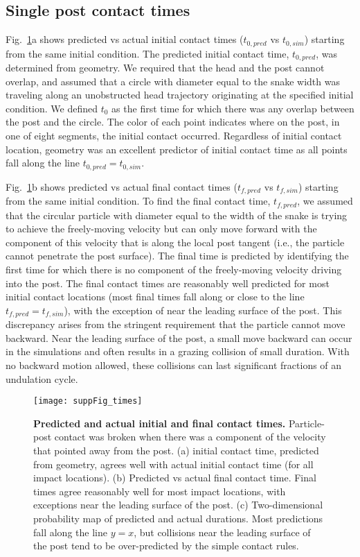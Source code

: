 \documentclass[aps,pre,twocolumn,superscriptaddress]{revtex4-1}
\begin{document}
\subsection{Single post contact times}
\label{suppmat:duration}
Fig.~\ref{fig:SuppTimes}a shows predicted vs actual initial contact times ($t_{0,pred}$ vs $t_{0,sim}$) starting from the same initial condition. The predicted initial contact time, $t_{0,pred}$, was determined from geometry.  We required that the head and the post cannot overlap, and assumed that a circle with diameter equal to the snake width was traveling along an unobstructed head trajectory originating at the specified initial condition. We defined $t_0$ as the first time for which there was any overlap between the post and the circle. The color of each point indicates where on the post, in one of eight segments, the initial contact occurred. Regardless of initial contact location, geometry was an excellent predictor of initial contact time as all points fall along the line $t_{0,pred} = t_{0,sim}$.  

Fig.~\ref{fig:SuppTimes}b shows predicted vs actual final contact times ($t_{f,pred}$ vs $t_{f,sim}$) starting from the same initial condition. To find the final contact time, $t_{f,pred}$, we assumed that the circular particle with diameter equal to the width of the snake is trying to achieve the freely-moving velocity but can only move forward with the component of this velocity that is along the local post tangent (i.e., the particle cannot penetrate the post surface). The final time is predicted by identifying the first time for which there is no component of the freely-moving velocity driving into the post. The final contact times are reasonably well predicted for most initial contact locations (most final times fall along or close to the line $t_{f,pred} = t_{f,sim}$), with the exception of near the leading surface of the post.  This discrepancy arises from the stringent requirement that the particle cannot move backward.  Near the leading surface of the post, a small move backward can occur in the simulations and often results in a grazing collision of small duration.  With no backward motion allowed, these collisions can last significant fractions of an undulation cycle.
\begin{figure}[h!]
	\texttt{[image: suppFig\_times]}
	\caption{\textbf{Predicted and actual initial and final contact times.} Particle-post contact was broken when there was a component of the velocity that pointed away from the post.  (a) initial contact time, predicted from geometry, agrees well with actual initial contact time (for all impact locations). (b) Predicted vs actual final contact time.  Final times agree reasonably well for most impact locations, with exceptions near the leading surface of the post. (c) Two-dimensional probability map of predicted and actual durations.  Most predictions fall along the line $y = x$, but collisions near the leading surface of the post tend to be over-predicted by the simple contact rules. }
	\label{fig:SuppTimes}
\end{figure}
\end{document}
